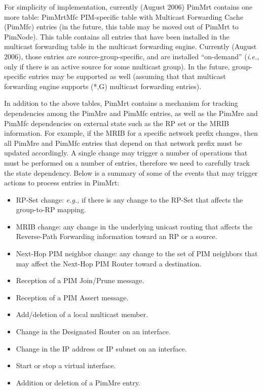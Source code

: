 \documentclass[11pt]{article}
\newcommand{\ie}{\emph{i.e.,}\xspace}
\newcommand{\eg}{\emph{e.g.,}\xspace}
\begin{document}
For simplicity of implementation, currently (August 2006) PimMrt
contains one more table: PimMrtMfc PIM-specific table with Multicast
Forwarding Cache (PimMfc) entries (in the future, this table may be
moved out of PimMrt to PimNode). This table contains all
entries that have been installed in the multicast forwarding table in
the multicast forwarding engine. Currently (August 2006), those
entries are source-group-specific, and are installed ``on-demand'' (\ie
only if there is an active source for some multicast group). In the future,
group-specific entries may be supported as well (assuming that that
multicast forwarding engine supports (*,G) multicast forwarding
entries).

In addition to the above tables, PimMrt contains a mechanism for
tracking dependencies among the PimMre and PimMfc entries, as well as
the PimMre and PimMfc dependencies on external state such as the RP set
or the MRIB information. For example, if the MRIB for a specific network
prefix changes, then all PimMre and PimMfc entries that depend on that
network prefix must be updated accordingly. A single change may trigger
a number of operations that must be performed on a number of entries,
therefore we need to carefully track the state dependency. Below is a
summary of some of the events that may trigger actions to process
entries in PimMrt:

\begin{itemize}

  \item RP-Set change: \eg if there is any change to the RP-Set that
  affects the group-to-RP mapping.

  \item MRIB change: any change in the underlying unicast routing that
  affects the Reverse-Path Forwarding information toward an RP or a
  source.

  \item Next-Hop PIM neighbor change: any change to the set of PIM
  neighbors that may affect the Next-Hop PIM Router toward a destination.

  \item Reception of a PIM Join/Prune message.

  \item Reception of a PIM Assert message.

  \item Add/deletion of a local multicast member.

  \item Change in the Designated Router on an interface.

  \item Change in the IP address or IP subnet on an interface.

  \item Start or stop a virtual interface.

  \item Addition or deletion of a PimMre entry.

\end{itemize}
\end{document}
